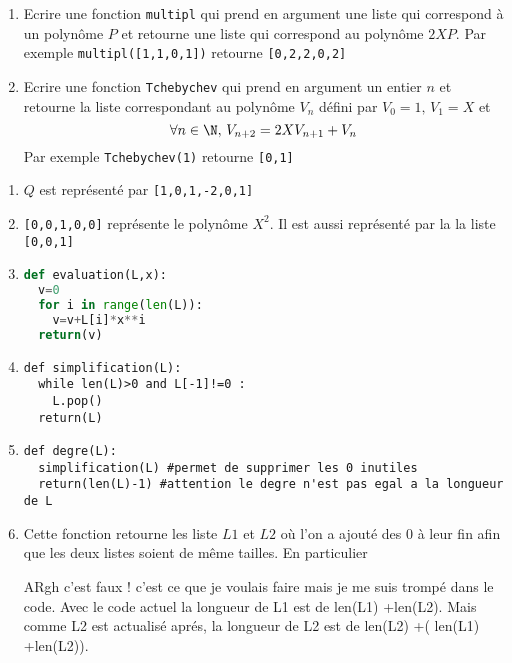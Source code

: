 \documentclass[a4paper, 11pt,reqno]{article}
\begin{document}
\begin{exercice}
\begin{enumerate}
\item Ecrire une fonction \texttt{multipl} qui prend en argument
une liste qui correspond à un polynôme $P$ et retourne une liste qui correspond au  polynôme $2XP$. Par exemple 
\texttt{multipl([1,1,0,1])} retourne \texttt{[0,2,2,0,2]}
\item Ecrire une fonction \texttt{Tchebychev} qui prend en argument un entier $n$ et retourne la liste correspondant  au polynôme $V_n$ défini par $V_0 =1, \, V_1=X$ et 
$$\forall n\in \N, \, V_{n+2}=2XV_{n+1} +V_n$$
Par exemple \texttt{Tchebychev(1)} retourne \texttt{[0,1]}


\end{enumerate}

\end{exercice}

\begin{correction}
\begin{enumerate}
\item $Q$ est représenté par \texttt{[1,0,1,-2,0,1]}
\item  \texttt{[0,0,1,0,0]} représente le polynôme $X^2$. Il est aussi représenté par la la liste  \texttt{[0,0,1]}
\item 
\begin{lstlisting}[language=Python]
def evaluation(L,x):
  v=0
  for i in range(len(L)):
    v=v+L[i]*x**i
  return(v)
\end{lstlisting}

\item 
\begin{lstlisting}
def simplification(L):
  while len(L)>0 and L[-1]!=0 :
    L.pop()
  return(L)
\end{lstlisting}

\item 
\begin{lstlisting}
def degre(L):
  simplification(L) #permet de supprimer les 0 inutiles
  return(len(L)-1) #attention le degre n'est pas egal a la longueur de L
\end{lstlisting}

\item Cette fonction retourne les liste $L1$ et $L2$ où l'on a ajouté des 0 à leur fin afin que les deux listes soient de même tailles. 
En particulier 

ARgh c'est faux ! c'est ce que je voulais faire mais je me suis trompé dans le code. Avec le code actuel la longueur de L1 est de  len(L1) +len(L2). Mais comme L2 est actualisé aprés, la longueur de L2 est de len(L2) +( len(L1) +len(L2)). 



\end{enumerate}
\end{correction}
\end{document}
